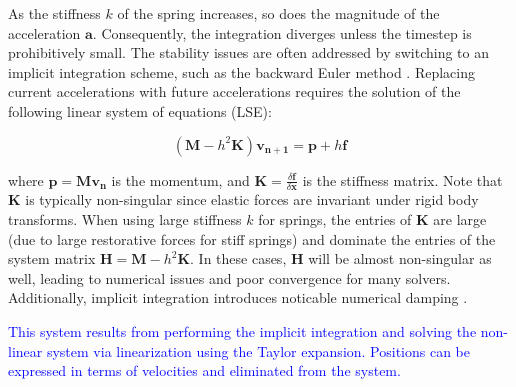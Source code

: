 \documentclass{article}
\begin{document}
As the stiffness $k$ of the spring increases, so does the magnitude of the acceleration $\bm{a}$. Consequently, the integration
diverges unless the timestep is prohibitively small. The stability issues are often addressed by switching to an implicit 
integration scheme, such as the backward Euler method \cite{baraff1998}. Replacing current accelerations with future accelerations
requires the solution of the following linear system of equations (LSE):

\[
    (\bm{M} - h^2\bm{K})\bm{v_{n+1}} = \bm{p} + h\bm{f}
\]

where $\bm{p} = \bm{Mv_n}$ is the momentum, and $\bm{K} = \frac{\delta \bm{f}}{\delta \bm{x}}$ is the stiffness matrix. Note that 
$\bm{K}$ is typically non-singular since elastic forces are invariant under rigid body transforms. When using large stiffness 
$k$ for springs, the entries of $\bm{K}$ are large (due to large restorative forces for stiff springs) and dominate the entries 
of the system matrix $\bm{H} = \bm{M} - h^2\bm{K}$. In these cases, $\bm{H}$ will be almost non-singular as well, leading to 
numerical issues and poor convergence for many solvers. Additionally, implicit integration introduces noticable numerical damping
\cite{servin2006}.

\textcolor{blue}{This system results from performing the implicit integration and solving the non-linear system via linearization
using the Taylor expansion. Positions can be expressed in terms of velocities and eliminated from the system.}
\end{document}
